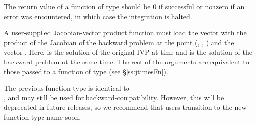 {
  The return value of a function of type  should be
  $0$ if successful or nonzero if an error was encountered, in which case
  the integration is halted.
}
{
  A user-supplied Jacobian-vector product function must load the vector 
  with the product of the Jacobian of the backward problem
  at the point (, , ) and the vector .
  Here,  is the solution of the original IVP at time  and
   is the solution of the backward problem at the same time.
  The rest of the arguments are equivalent to those passed to a function of type
   (see \S\ref{ss:jtimesFn}).

  The previous function type  is identical to
  \\ \noindent {}, and may still be used for
  backward-compatibility.  However, this will be deprecated in future
  releases, so we recommend that users transition to the new function
  type name soon.
}


